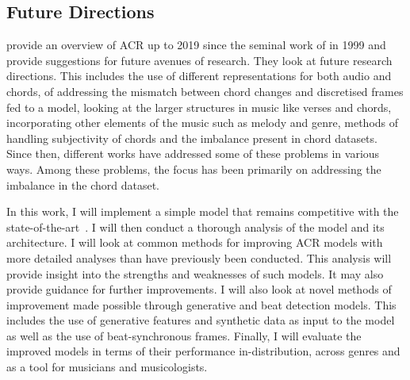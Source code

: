 \subsection{Future Directions}

\citet{20YearsofACR} provide an overview of ACR up to 2019 since the seminal work of \citet{FujishimaACR} in 1999 and provide suggestions for future avenues of research. They look at future research directions. This includes the use of different representations for both audio and chords, of addressing the mismatch between chord changes and discretised frames fed to a model, looking at the larger structures in music like verses and chords, incorporating other elements of the music such as melody and genre, methods of handling subjectivity of chords and the imbalance present in chord datasets. Since then, different works have addressed some of these problems in various ways. Among these problems, the focus has been primarily on addressing the imbalance in the chord dataset. 

In this work, I will implement a simple model that remains competitive with the state-of-the-art~\citep{StructuredTraining}. I will then conduct a thorough analysis of the model and its architecture. I will look at common methods for improving ACR models with more detailed analyses than have previously been conducted. This  analysis will provide insight into the strengths and weaknesses of such models. It may also provide guidance for further improvements. I will also look at novel methods of improvement made possible through generative and beat detection models. This includes the use of generative features and synthetic data as input to the model as well as the use of beat-synchronous frames. Finally, I will evaluate the improved models in terms of their performance in-distribution, across genres and as a tool for musicians and musicologists.

